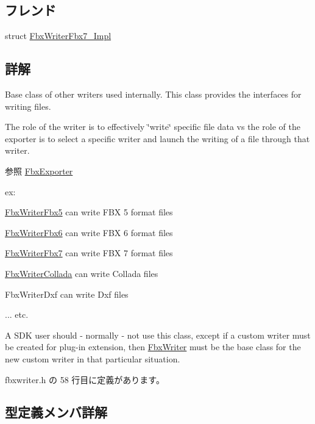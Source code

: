 \subsection*{フレンド}
\begin{DoxyCompactItemize}
\item 
struct \hyperlink{class_fbx_writer_af1c8c15ac15cf43655af7772383daefd}{Fbx\+Writer\+Fbx7\+\_\+\+Impl}
\end{DoxyCompactItemize}


\subsection{詳解}
Base class of other writers used internally. This class provides the interfaces for writing files.

The role of the writer is to effectively \char`\"{}write\char`\"{} specific file data vs the role of the exporter is to select a specific writer and launch the writing of a file through that writer. \begin{DoxySeeAlso}{参照}
\hyperlink{class_fbx_exporter}{Fbx\+Exporter}
\end{DoxySeeAlso}
ex\+:
\begin{DoxyItemize}
\item \hyperlink{class_fbx_writer_fbx5}{Fbx\+Writer\+Fbx5} can write F\+BX 5 format files
\item \hyperlink{class_fbx_writer_fbx6}{Fbx\+Writer\+Fbx6} can write F\+BX 6 format files
\item \hyperlink{class_fbx_writer_fbx7}{Fbx\+Writer\+Fbx7} can write F\+BX 7 format files
\item \hyperlink{class_fbx_writer_collada}{Fbx\+Writer\+Collada} can write Collada files
\item Fbx\+Writer\+Dxf can write Dxf files
\item ... etc.
\end{DoxyItemize}

A S\+DK user should -\/ normally -\/ not use this class, except if a custom writer must be created for plug-\/in extension, then \hyperlink{class_fbx_writer}{Fbx\+Writer} must be the base class for the new custom writer in that particular situation. 

 fbxwriter.\+h の 58 行目に定義があります。



\subsection{型定義メンバ詳解}
\mbox{\label{class_fbx_writer_aa634a7d29a01f8197f814437644e845b}} 
